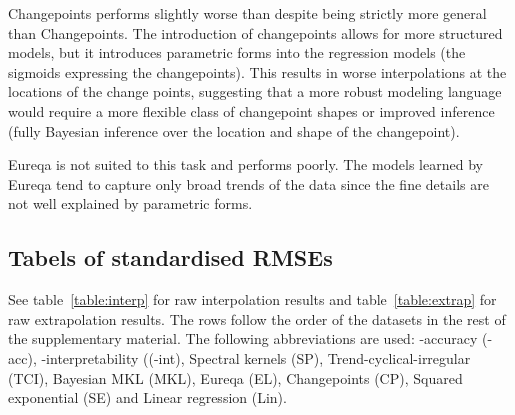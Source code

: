 Changepoints performs slightly worse than \MKL{} despite being strictly more general than Changepoints.
The introduction of changepoints allows for more structured models, but it introduces parametric forms into the regression models (\ie the sigmoids expressing the changepoints).
This results in worse interpolations at the locations of the change points, suggesting that a more robust modeling language would require a more flexible class of changepoint shapes or improved inference (\eg fully Bayesian inference over the location and shape of the changepoint).

Eureqa is not suited to this task and performs poorly.
The models learned by Eureqa tend to capture only broad trends of the data since the fine details are not well explained by parametric forms.

\subsection{Tabels of standardised RMSEs}

See table~\ref{table:interp} for raw interpolation results and table~\ref{table:extrap} for raw extrapolation results. 
The rows follow the order of the datasets in the rest of the supplementary material.
The following abbreviations are used: \procedurename{}-accuracy (\procedurename{}-acc), \procedurename{}-interpretability ((\procedurename{}-int), Spectral kernels (SP), Trend-cyclical-irregular (TCI), Bayesian MKL (MKL), Eureqa (EL), Changepoints (CP), Squared exponential (SE) and Linear regression (Lin).

